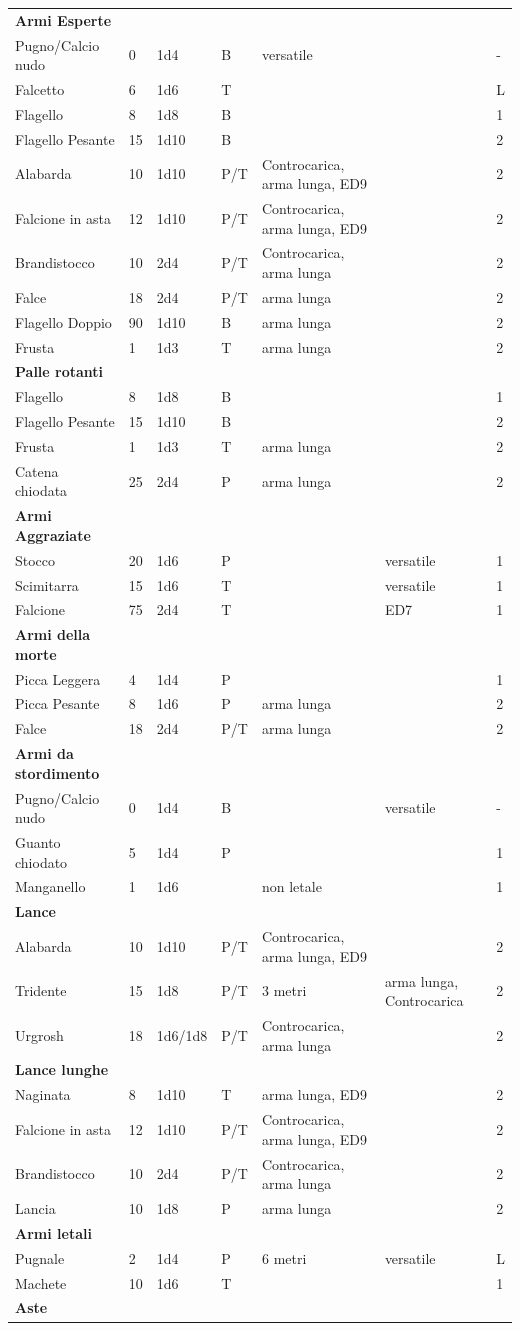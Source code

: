 \documentclass[a4paper,11pt,twoside,openany]{book}
\begin{document}
\begin{longtable}{|L{3.5cm} |k{1,3cm} |k{1.5cm}| k{1.3cm} |L{3.2cm} |k{2.7cm}|k{2cm}|}
	\textbf{Armi Esperte}& & &  & & & \tabularnewline
	Pugno/Calcio nudo    & 0    & 1d4  & B& versatile & & -\tabularnewline
	Falcetto   & 6    & 1d6  & T& & & L\tabularnewline
	Flagello   & 8    & 1d8  & B& & & 1\tabularnewline
	Flagello Pesante& 15   & 1d10 & B& & & 2\tabularnewline
	Alabarda   & 10   & 1d10 & P/T   & Controcarica, arma lunga, ED9 & & 2\tabularnewline
	Falcione in asta& 12   & 1d10 & P/T   & Controcarica, arma lunga, ED9 & & 2\tabularnewline
	Brandistocco    & 10   & 2d4  & P/T   & Controcarica, arma lunga & & 2\tabularnewline
	Falce & 18   & 2d4  & P/T   & arma lunga& & 2\tabularnewline
	Flagello Doppio & 90   & 1d10 & B& arma lunga& & 2\tabularnewline
	Frusta& 1    & 1d3  & T& arma lunga& & 2\tabularnewline
	\textbf{Palle rotanti}    & & &  & & & \tabularnewline
	Flagello   & 8    & 1d8  & B& & & 1\tabularnewline
	Flagello Pesante& 15   & 1d10 & B& & & 2\tabularnewline
	Frusta& 1    & 1d3  & T& arma lunga& & 2\tabularnewline
	Catena chiodata & 25   & 2d4  & P& arma lunga& & 2\tabularnewline
	\textbf{Armi Aggraziate}  & & &  & & & \tabularnewline
	Stocco& 20   & 1d6  & P& & versatile & 1\tabularnewline
	Scimitarra & 15   & 1d6  & T& & versatile & 1\tabularnewline
	Falcione   & 75   & 2d4  & T& & ED7  & 1\tabularnewline
	\textbf{Armi della morte} & & &  & & & \tabularnewline
	Picca Leggera   & 4    & 1d4  & P& & & 1\tabularnewline
	Picca Pesante   & 8    & 1d6  & P& arma lunga& & 2\tabularnewline
	Falce & 18   & 2d4  & P/T   & arma lunga& & 2\tabularnewline
	\textbf{Armi da stordimento}   & & &  & & & \tabularnewline
	Pugno/Calcio nudo    & 0    & 1d4  & B& & versatile & -\tabularnewline
	Guanto chiodato & 5    & 1d4  & P& & & 1\tabularnewline
	Manganello & 1    & 1d6  &  & non letale& & 1\tabularnewline
	\textbf{Lance}  & & &  & & & \tabularnewline
	Alabarda   & 10   & 1d10 & P/T   & Controcarica, arma lunga, ED9 & & 2\tabularnewline
	Tridente   & 15   & 1d8  & P/T   & 3 metri   & arma lunga, Controcarica & 2\tabularnewline
	Urgrosh    & 18   & 1d6/1d8   & P/T   & Controcarica, arma lunga & & 2\tabularnewline
	\textbf{Lance lunghe}& & &  & & & \tabularnewline
	Naginata   & 8    & 1d10 & T& arma lunga, ED9& & 2\tabularnewline
	Falcione in asta& 12   & 1d10 & P/T   & Controcarica, arma lunga, ED9 & & 2\tabularnewline
	Brandistocco    & 10   & 2d4  & P/T   & Controcarica, arma lunga & & 2\tabularnewline
	Lancia& 10   & 1d8  & P& arma lunga& & 2\tabularnewline
	\textbf{Armi letali} & & &  & & & \tabularnewline
	Pugnale    & 2    & 1d4  & P& 6 metri   & versatile & L\tabularnewline
	Machete    & 10   & 1d6  & T& & & 1\tabularnewline
	\textbf{Aste}   & & &  & & & \tabularnewline

\end{longtable}
\end{document}
